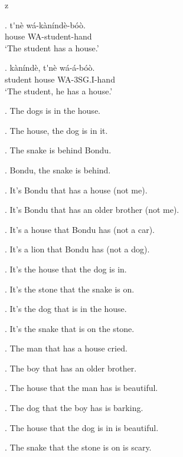 z   \documentclass{assets/fieldnotes}
\begin{document}

\exg. t\'{}n\`{e} w\'{a}-k\`{a}n\'{i}nd\`{e}-b\'{o}\`{o}. \\
house WA-student-hand \\
`The student has a house.'

\exg. k\`{a}n\'{i}nd\`{e}, t\'{}n\`{e} w\'{a}-\'{a}-b\'{o}\`{o}. \\
student house WA-3SG.I-hand \\
`The student, he has a house.' 

\ex. The dogs is in the house. 

\ex. The house, the dog is in it. 

\ex. The snake is behind Bondu. 

\ex. Bondu, the snake is behind. 


\ex. It's Bondu that has a house (not me). 

\ex. It's Bondu that has an older brother (not me). 

\ex. It's a house that Bondu has (not a car). 

\ex. It's a lion that Bondu has (not a dog). 

\ex. It's the house that the dog is in. 

\ex. It's the stone that the snake is on. 

\ex. It's the dog that is in the house. 

\ex. It's the snake that is on the stone.  


\ex. The man that has a house cried. 

\ex. The boy that has an older brother. 

\ex. The house that the man has is beautiful. 

\ex. The dog that the boy has is barking. 

\ex. The house that the dog is in is beautiful. 

\ex. The snake that the stone is on is scary. 
\end{document}
